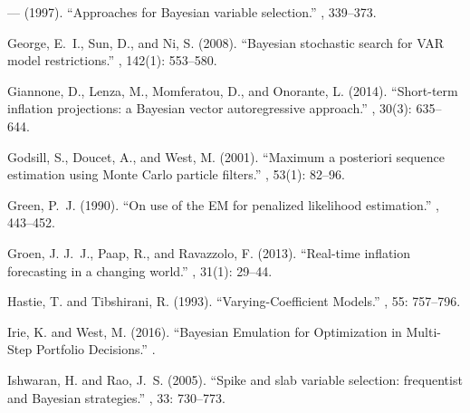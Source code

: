 \documentclass[ba]{imsart}
\numberwithin{equation}{section}
\theoremstyle{plain}
\begin{document}
\begin{thebibliography}{70}
--- (1997).
\newblock \enquote{Approaches for Bayesian variable selection.}
, 339--373.
\endbibitem

George, E.~I., Sun, D., and Ni, S. (2008).
\newblock \enquote{Bayesian stochastic search for VAR model restrictions.}
, 142(1): 553--580.
\endbibitem

Giannone, D., Lenza, M., Momferatou, D., and Onorante, L. (2014).
\newblock \enquote{Short-term inflation projections: a Bayesian vector
  autoregressive approach.}
, 30(3): 635--644.
\endbibitem

Godsill, S., Doucet, A., and West, M. (2001).
\newblock \enquote{Maximum a posteriori sequence estimation using Monte Carlo
  particle filters.}
, 53(1):
  82--96.
\endbibitem

Green, P.~J. (1990).
\newblock \enquote{On use of the EM for penalized likelihood estimation.}
, 443--452.
\endbibitem

Groen, J. J.~J., Paap, R., and Ravazzolo, F. (2013).
\newblock \enquote{Real-time inflation forecasting in a changing world.}
, 31(1): 29--44.
\endbibitem

Hastie, T. and Tibshirani, R. (1993).
\newblock \enquote{Varying-Coefficient Models.}
, 55: 757--796.
\endbibitem

Irie, K. and West, M. (2016).
\newblock \enquote{Bayesian Emulation for Optimization in Multi-Step Portfolio
  Decisions.}
.
\endbibitem

Ishwaran, H. and Rao, J.~S. (2005).
\newblock \enquote{Spike and slab variable selection: frequentist and
  {B}ayesian strategies.}
, 33: 730--773.
\endbibitem


\end{thebibliography}
\end{document}
